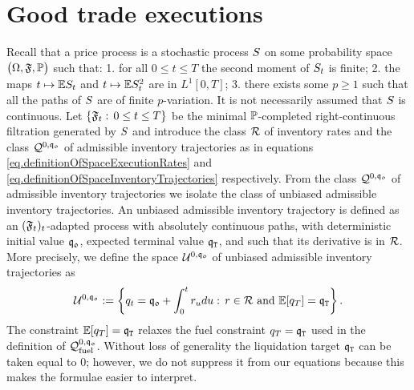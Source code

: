\documentclass[10pt,a4paper]{article}
\begin{document}
\section{Good trade executions} \label{sec.goodTradeExecutions}
Recall that a price process is a stochastic process $S$ on some probability space $\big(\Omega,\mathfrak{F}, {\mathbb{P}} \big)$ such that: 1. for all $0\leq t\leq T$ the second moment of $S_t$ is finite; 2. the maps $t\mapsto \mathbb{{E}}S_t$ and $t\mapsto \mathbb{{E}}S^{2}_t$ are in $L^1[0,T]$; 3. there exists some $p\geq 1$ such that all the paths of $S$ are of finite $p$-variation. It is not necessarily assumed that $S$ is continuous. Let $\lbrace \mathfrak{F}_t: \, 0\leq t\leq T \rbrace$ be the minimal ${\mathbb{P}}$-completed right-continuous filtration generated by $S$ and introduce the class $\mathcal{R}$ of inventory rates and the class $\mathcal{Q}^{0,\mathfrak{q_0}}$ of admissible inventory trajectories as in equations \eqref{eq.definitionOfSpaceExecutionRates} and \eqref{eq.definitionOfSpaceInventoryTrajectories} respectively. From the class $\mathcal{Q}^{0,\mathfrak{q_0}}$ of admissible inventory trajectories we isolate the class of unbiased admissible inventory trajectories. 
An unbiased  admissible inventory trajectory is defined as an $(\mathfrak{F}_t)_t$-adapted process with absolutely continuous paths, with deterministic initial value $\mathfrak{q_0}$, expected terminal value $\mathfrak{q}_{\mathtt{T} }$, and such that its derivative is in $\mathcal{R}$.  More precisely, we define the space $\mathcal{U}^{0,\mathfrak{q_0}}$ of unbiased admissible inventory trajectories as 
\begin{equation*}
\mathcal{U}^{0,\mathfrak{q_0}}:= \left\lbrace
q_t=\mathfrak{q_0} + \int_{0}^{t}r_udu: \, r \in \mathcal{R} \text{ and } \mathbb{{E}} [q_T] = \mathfrak{q}_{\mathtt{T} }
\right\rbrace.
\end{equation*}
The constraint $\mathbb{{E}} [q_T] = \mathfrak{q}_{\mathtt{T} }$ relaxes the fuel constraint $ q_T = \mathfrak{q}_{\mathtt{T} }$ used in the definition of $\mathcal{Q}_{\text{fuel}}^{0,\mathfrak{q_0}}$. Without loss of generality the liquidation target $\mathfrak{q}_{\mathtt{T} }$ can be taken equal to $0$; however, we do not suppress it from our equations because this makes the formulae easier to interpret. 
\end{document}
